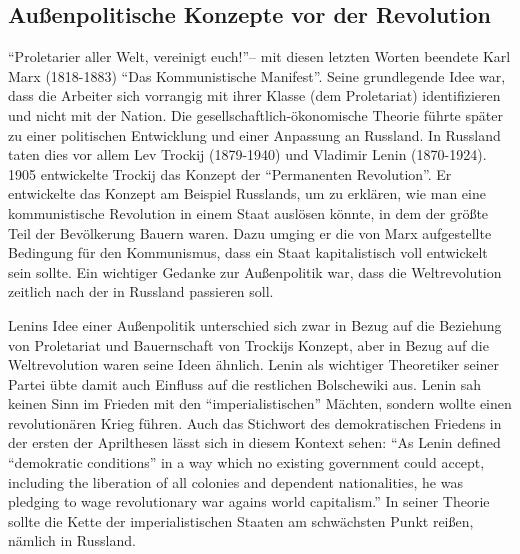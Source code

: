 \documentclass{../../sem_paper}
\begin{document}
\subsection{Außenpolitische Konzepte vor der Revolution}
\label{sec: for_policy}
"`Proletarier aller Welt, vereinigt euch!"'-- mit diesen letzten Worten beendete Karl Marx (1818-1883) "`Das Kommunistische Manifest"'. Seine grundlegende Idee war, dass die Arbeiter sich vorrangig mit ihrer Klasse (dem Proletariat) identifizieren und nicht mit der Nation. Die gesellschaftlich-ökonomische Theorie führte später zu einer politischen Entwicklung und einer Anpassung an Russland. In Russland taten dies vor allem Lev Trockij (1879-1940) und Vladimir Lenin (1870-1924).
1905 entwickelte Trockij das Konzept der "`Permanenten Revolution"'. 
Er entwickelte das Konzept am Beispiel Russlands, um zu erklären, wie man eine kommunistische Revolution in einem Staat auslösen könnte, in dem der größte Teil der Bevölkerung Bauern waren. Dazu umging er die von Marx aufgestellte Bedingung für den Kommunismus, dass ein Staat kapitalistisch voll entwickelt sein sollte. 
Ein wichtiger Gedanke zur Außenpolitik war, dass die Weltrevolution zeitlich nach der in Russland passieren soll.

Lenins Idee einer Außenpolitik unterschied sich zwar in Bezug auf die Beziehung von Proletariat und Bauernschaft von Trockijs Konzept, aber in Bezug auf die Weltrevolution waren seine Ideen ähnlich. Lenin als wichtiger Theoretiker seiner Partei übte damit auch Einfluss auf die restlichen Bolschewiki aus. Lenin sah keinen Sinn im Frieden mit den "`imperialistischen"' Mächten, sondern wollte einen revolutionären Krieg führen.\autocite[1]{maka2010}
Auch das Stichwort des demokratischen Friedens in der ersten der Aprilthesen lässt sich in diesem Kontext sehen: "`As Lenin defined "`demokratic conditions"' in a way which no existing government could accept, including the liberation of all colonies and dependent nationalities, he was pledging to wage revolutionary war agains world capitalism."'\autocite[7]{debo1979}
In seiner Theorie sollte die Kette der imperialistischen Staaten am schwächsten Punkt reißen, nämlich in Russland.
\end{document}
